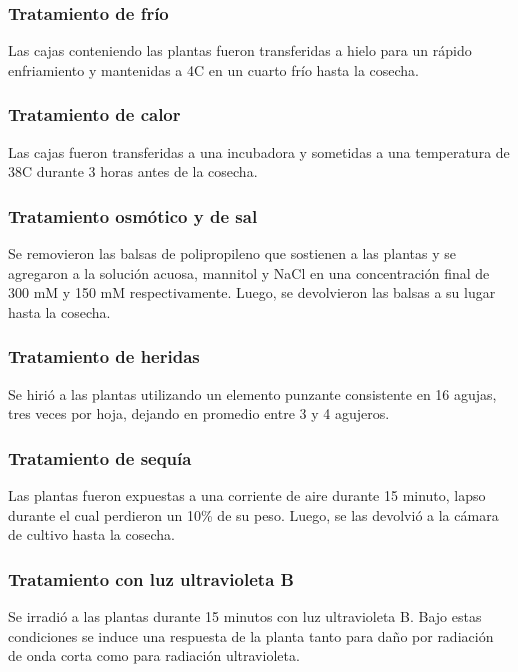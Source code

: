 \subsubsection*{Tratamiento de frío}
Las cajas conteniendo las plantas fueron transferidas a hielo para un rápido enfriamiento y mantenidas a 4\degree C en un cuarto frío hasta la cosecha.
\subsubsection*{Tratamiento de calor}
Las cajas fueron transferidas a una incubadora y sometidas a una temperatura de 38\degree C durante 3 horas antes de la cosecha.
\subsubsection*{Tratamiento osmótico y de sal}
Se removieron las balsas de polipropileno que sostienen a las plantas y se agregaron a la solución acuosa, mannitol y NaCl en una concentración final de 300 mM y 150 mM respectivamente. Luego, se devolvieron las balsas a su lugar hasta la cosecha.
\subsubsection*{Tratamiento de heridas}
Se hirió a las plantas utilizando un elemento punzante consistente en 16 agujas, tres veces por hoja, dejando en promedio entre 3 y 4 agujeros.
\subsubsection*{Tratamiento de sequía}
Las plantas fueron expuestas a una corriente de aire durante 15 minuto, lapso durante el cual perdieron un 10\% de su peso. Luego, se las devolvió a la cámara de cultivo hasta la cosecha.
\subsubsection*{Tratamiento con luz ultravioleta B}
Se irradió a las plantas durante 15 minutos con luz ultravioleta B. Bajo estas condiciones se induce una respuesta de la planta tanto para daño por radiación de onda corta como para radiación ultravioleta. \cite{AtGenExpress, Kilian2007}
